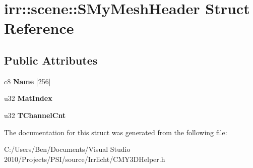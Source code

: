 \hypertarget{structirr_1_1scene_1_1_s_my_mesh_header}{\section{irr\-:\-:scene\-:\-:S\-My\-Mesh\-Header Struct Reference}
\label{structirr_1_1scene_1_1_s_my_mesh_header}
}
\subsection*{Public Attributes}
\begin{DoxyCompactItemize}
\item 
\hypertarget{structirr_1_1scene_1_1_s_my_mesh_header_a4faf01155665b7be7a4538c8d2b9117d}{c8 {\bfseries Name} \mbox{[}256\mbox{]}}\label{structirr_1_1scene_1_1_s_my_mesh_header_a4faf01155665b7be7a4538c8d2b9117d}

\item 
\hypertarget{structirr_1_1scene_1_1_s_my_mesh_header_abb240db8ebcdf76149a4b748458f70ae}{u32 {\bfseries Mat\-Index}}\label{structirr_1_1scene_1_1_s_my_mesh_header_abb240db8ebcdf76149a4b748458f70ae}

\item 
\hypertarget{structirr_1_1scene_1_1_s_my_mesh_header_a929aab6de883f1314378ab340ea2d225}{u32 {\bfseries T\-Channel\-Cnt}}\label{structirr_1_1scene_1_1_s_my_mesh_header_a929aab6de883f1314378ab340ea2d225}

\end{DoxyCompactItemize}


The documentation for this struct was generated from the following file\-:\begin{DoxyCompactItemize}
\item 
C\-:/\-Users/\-Ben/\-Documents/\-Visual Studio 2010/\-Projects/\-P\-S\-I/source/\-Irrlicht/C\-M\-Y3\-D\-Helper.\-h\end{DoxyCompactItemize}
